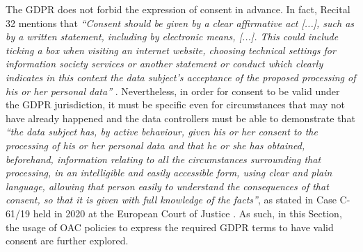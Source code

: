 The GDPR does not forbid the expression of consent in advance.
In fact, Recital 32 mentions that \textit{``Consent should be given by a clear affirmative act [...], such as by a written statement, including by electronic means, [...]. This could include ticking a box when visiting an internet website, choosing technical settings for information society services or another statement or conduct which clearly indicates in this context the data subject’s acceptance of the proposed processing of his or her personal data''} \citeyearpar{noauthor_regulation_2016}.
Nevertheless, in order for consent to be valid under the GDPR jurisdiction, it must be specific even for circumstances that may not have already happened \citep{kosta_consent_2013} and the data controllers must be able to demonstrate that \textit{``the data subject has, by active behaviour, given his or her consent to the processing of his or her personal data and that he or she has obtained, beforehand, information relating to all the circumstances surrounding that processing, in an intelligible and easily accessible form, using clear and plain language, allowing that person easily to understand the consequences of that consent, so that it is given with full knowledge of the facts''}, as stated in Case C-61/19 held in 2020 at the European Court of Justice \citeyearpar{noauthor_orange_2020}.
As such, in this Section, the usage of OAC policies to express the required GDPR terms to have valid consent are further explored. 
 
